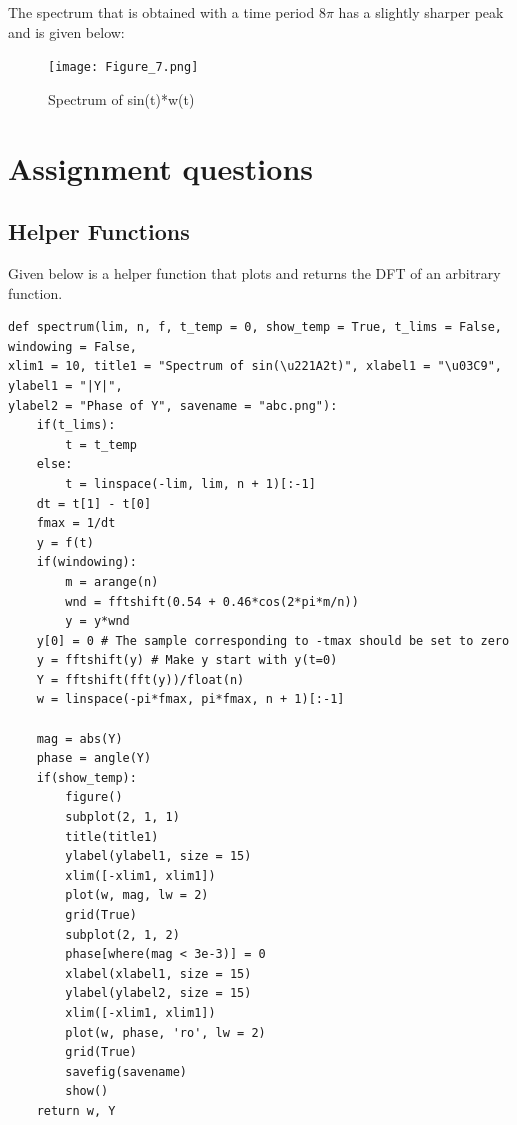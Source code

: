 \documentclass{article}
\begin{document}
The spectrum that is obtained with a time period $8\pi$ has a slightly sharper peak and is given below:
\begin{figure}[h!]
\centering
\texttt{[image: Figure\_7.png]}
\caption{Spectrum of sin(t)*w(t)}
\label{fig:universe}
\end{figure}

\section{Assignment questions}

\subsection{Helper Functions}
Given below is a helper function that plots and returns the DFT of an arbitrary function.

\lstset{language=Python}
\lstset{frame=lines}
\lstset{basicstyle=\footnotesize}
\begin{lstlisting}
def spectrum(lim, n, f, t_temp = 0, show_temp = True, t_lims = False, windowing = False, 
xlim1 = 10, title1 = "Spectrum of sin(\u221A2t)", xlabel1 = "\u03C9", ylabel1 = "|Y|", 
ylabel2 = "Phase of Y", savename = "abc.png"):
    if(t_lims):
        t = t_temp
    else:
        t = linspace(-lim, lim, n + 1)[:-1]
    dt = t[1] - t[0]
    fmax = 1/dt
    y = f(t)
    if(windowing):
        m = arange(n)
        wnd = fftshift(0.54 + 0.46*cos(2*pi*m/n))
        y = y*wnd
    y[0] = 0 # The sample corresponding to -tmax should be set to zero
    y = fftshift(y) # Make y start with y(t=0)
    Y = fftshift(fft(y))/float(n)
    w = linspace(-pi*fmax, pi*fmax, n + 1)[:-1]
    
    mag = abs(Y)
    phase = angle(Y)
    if(show_temp):
        figure()
        subplot(2, 1, 1)
        title(title1)
        ylabel(ylabel1, size = 15)
        xlim([-xlim1, xlim1])
        plot(w, mag, lw = 2)
        grid(True)
        subplot(2, 1, 2)
        phase[where(mag < 3e-3)] = 0
        xlabel(xlabel1, size = 15)
        ylabel(ylabel2, size = 15)
        xlim([-xlim1, xlim1])
        plot(w, phase, 'ro', lw = 2)
        grid(True)
        savefig(savename)
        show()
    return w, Y
\end{lstlisting}
\end{document}
